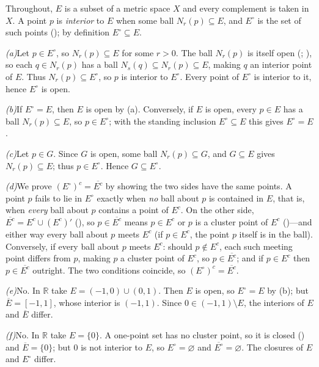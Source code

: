 \documentclass[main.tex]{subfiles}
\begin{document}
\begin{Solution}
Throughout, $E$ is a subset of a metric space $X$ and every complement is taken in $X$. A point $p$ is
\emph{interior} to $E$ when some ball $N_{r}(p)\subseteq E$, and $E^{\circ}$ is the set of such points
(); by definition $E^{\circ}\subseteq E$.

\smallskip\noindent\textit{(a)}\enspace Let $p\in E^{\circ}$, so $N_{r}(p)\subseteq E$ for some
$r>0$. The ball $N_{r}(p)$ is itself open (; ), so each $q\in N_{r}(p)$ has a ball $N_{s}(q)\subseteq N_{r}(p)\subseteq E$, making $q$ an
interior point of $E$. Thus $N_{r}(p)\subseteq E^{\circ}$, so $p$ is interior to $E^{\circ}$. Every
point of $E^{\circ}$ is interior to it, hence $E^{\circ}$ is open.

\smallskip\noindent\textit{(b)}\enspace If $E^{\circ}=E$, then $E$ is open by (a). Conversely, if $E$
is open, every $p\in E$ has a ball $N_{r}(p)\subseteq E$, so $p\in E^{\circ}$; with the standing
inclusion $E^{\circ}\subseteq E$ this gives $E^{\circ}=E$.

\smallskip\noindent\textit{(c)}\enspace Let $p\in G$. Since $G$ is open, some ball $N_{r}(p)\subseteq
G$, and $G\subseteq E$ gives $N_{r}(p)\subseteq E$; thus $p\in E^{\circ}$. Hence $G\subseteq
E^{\circ}$.

\smallskip\noindent\textit{(d)}\enspace We prove $(E^{\circ})^{c}=\overline{E^{c}}$ by showing the two
sides have the same points. A point $p$ fails to lie in $E^{\circ}$ exactly when \emph{no} ball about
$p$ is contained in $E$, that is, when \emph{every} ball about $p$ contains a point of $E^{c}$. On the
other side, $\overline{E^{c}}=E^{c}\cup(E^{c})'$ (), so $p\in\overline{E^{c}}$ means $p\in
E^{c}$ or $p$ is a cluster point of $E^{c}$ ()---and either way every ball about $p$ meets
$E^{c}$ (if $p\in E^{c}$, the point $p$ itself is in the ball). Conversely, if every ball about $p$
meets $E^{c}$: should $p\notin E^{c}$, each such meeting point differs from $p$, making $p$ a cluster
point of $E^{c}$, so $p\in\overline{E^{c}}$; and if $p\in E^{c}$ then $p\in\overline{E^{c}}$ outright.
The two conditions coincide, so $(E^{\circ})^{c}=\overline{E^{c}}$.

\smallskip\noindent\textit{(e)}\enspace No. In $\mathbb R$ take $E=(-1,0)\cup(0,1)$. Then $E$ is open,
so $E^{\circ}=E$ by (b); but $\overline{E}=[-1,1]$, whose interior is $(-1,1)$. Since $0\in(-1,1)\setminus
E$, the interiors of $E$ and $\overline{E}$ differ.

\smallskip\noindent\textit{(f)}\enspace No. In $\mathbb R$ take $E=\{0\}$. A one-point set has no
cluster point, so it is closed () and $\overline{E}=\{0\}$; but $0$ is not interior to
$E$, so $E^{\circ}=\varnothing$ and $\overline{E^{\circ}}=\varnothing$. The closures of $E$ and
$E^{\circ}$ differ.
\end{Solution}
\end{document}
